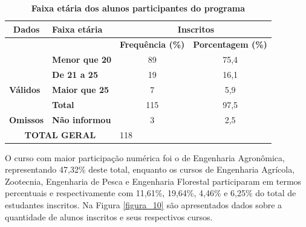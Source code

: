 \begin{table}[H]
\centering
\caption{\textbf{Faixa etária dos alunos participantes do programa}}
\label{tabela_45}
\begin{tabular}{clcc} 
\hline\hline
 \textbf{Dados}                       & \textbf{Faixa etária}  & \multicolumn{2}{c}{~\textbf{Inscritos} }                                                        \\ 
\hline
\multirow{3}{*}{}                     &                        & \multicolumn{1}{l}{\textbf{Frequência (\%)} } & \multicolumn{1}{l}{\textbf{Porcentagem (\%)} }  \\
                                      & \textbf{Menor que 20}  & 89                                            & 75,4                                            \\
                                      & \textbf{De 21 a 25}    & 19                                            & 16,1                                            \\
\multicolumn{1}{l}{\textbf{Válidos} } & \textbf{Maior que 25}  & 7                                             & 5,9                                             \\
\multicolumn{1}{l}{}                  & \textbf{Total}         & 115                                           & 97,5                                            \\ 
\hline
\multicolumn{1}{l}{\textbf{Omissos} } & \textbf{Não informou}  & 3                                             & 2,5                                             \\ 
\hline
\multicolumn{2}{c}{\textbf{TOTAL GERAL} }                      & \multicolumn{1}{l}{118}                       &                                                 \\
\hline\hline
\end{tabular}
\end{table}


O curso com maior participação numérica foi o de Engenharia Agronômica, representando 47,32\% deste total, enquanto os cursos de Engenharia Agrícola, Zootecnia, Engenharia de Pesca e Engenharia Florestal participaram em termos percentuais e respectivamente com 11,61\%, 19,64\%, 4,46\% e 6,25\% do total de estudantes inscritos. Na Figura \ref{figura_10} são apresentados dados sobre a quantidade de alunos inscritos e seus respectivos cursos.




